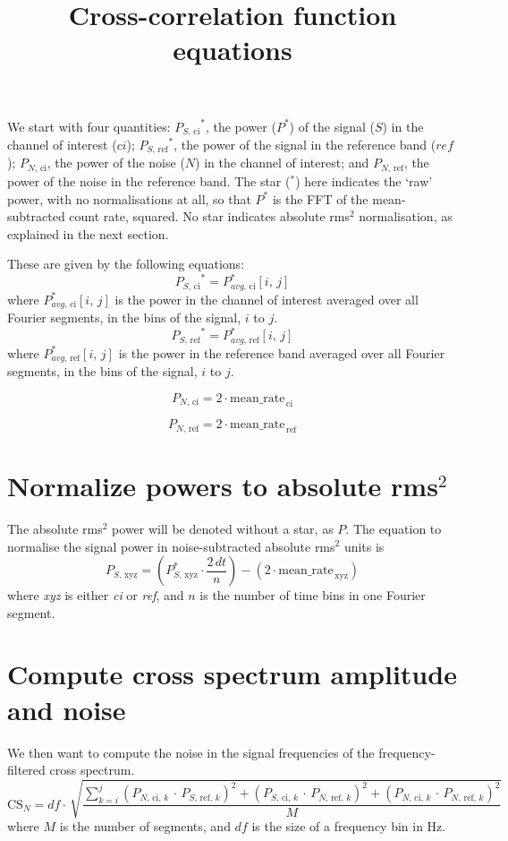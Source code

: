 \documentclass[11pt, oneside, reqno, a4paper]{article}
\title{Cross-correlation function equations}
\date{}
\newcommand{\be}{\begin{equation}}
\newcommand{\ee}{\end{equation}}
\newcommand{\scp}{\ensuremath{P_{S, \,\text{ci}}}}
\newcommand{\srp}{\ensuremath{P_{S, \,\text{ref}}}}
\newcommand{\ncp}{\ensuremath{P_{N, \,\text{ci}}}}
\newcommand{\nrp}{\ensuremath{P_{N, \,\text{ref}}}}
\theoremstyle{plain}
\numberwithin{equation}{section}
\begin{document}
\maketitle
We start with four quantities: 
$\scp^*$, the power ($P^*$) of the signal ($S$) in the channel of interest ($ci$); 
$\srp^*$, the power of the signal in the reference band ($ref$);
$\ncp$, the power of the noise ($N$) in the channel of interest; and
$\nrp$, the power of the noise in the reference band.
The star ($^*$) here indicates the `raw' power, with no normalisations at all, so that $P^*$ is the FFT of the mean-subtracted count rate, squared. No star indicates absolute rms$^2$ normalisation, as explained in the next section.

These are given by the following equations:
\be
\scp^* = P^*_{avg,\,\text{ci}} [i,\,j]
\ee
where $P^*_{avg,\,\text{ci}} [i,\,j]$ is the power in the channel of interest averaged over all Fourier segments, in the bins of the signal, $i$ to $j$.
\be
\srp^* = P^*_{avg,\,\text{ref}} [i,\,j]
\ee
where $P^*_{avg,\,\text{ref}} [i,\,j]$ is the power in the reference band averaged over all Fourier segments, in the bins of the signal, $i$ to $j$.

\be
\ncp = 2 \cdot \text{mean\_rate}_{\,\text{ci}}
\ee

\be
\nrp = 2 \cdot \text{mean\_rate}_{\,\text{ref}}
\ee

\section{Normalize powers to absolute rms$^2$}
The absolute rms$^2$ power will be denoted without a star, as $P$. The equation to normalise the signal power in noise-subtracted absolute rms$^2$ units is
\be
P_{S,\,\text{xyz}} = \left(P^*_{S,\,\text{xyz}} \cdot \frac{2\,dt}{n} \right) - \left(2 \cdot \text{mean\_rate}_{\,\text{xyz}}\right)
\ee
where \textit{xyz} is either \textit{ci} or \textit{ref}, and $n$ is the number of time bins in one Fourier segment.

\section{Compute cross spectrum amplitude and noise}
We then want to compute the noise in the signal frequencies of the frequency-filtered cross spectrum. 
\be
\text{CS}_{N} = df \cdot\,\sqrt{\frac{\sum_{k=i}^j \left(P_{N, \,\text{ci}, \,k} \,\cdot\, P_{S, \,\text{ref},\,k} \right)^2 + \left(P_{S, \,\text{ci}, \,k} \,\cdot\, P_{N, \,\text{ref},\,k} \right)^2 + \left(P_{N, \,\text{ci}, \,k} \,\cdot\, P_{N, \,\text{ref},\,k} \right)^2 }{M}}
\ee
where $M$ is the number of segments, and $df$ is the size of a frequency bin in Hz.
\end{document}
